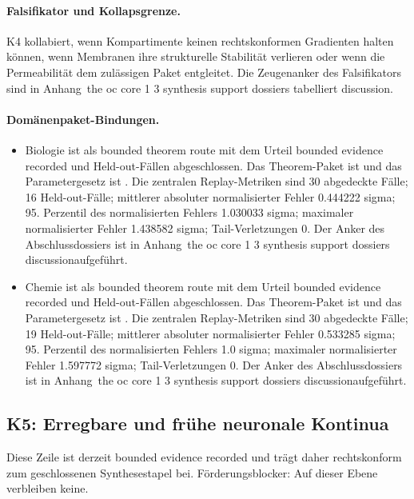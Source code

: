 \paragraph{Falsifikator und Kollapsgrenze.}
K4 kollabiert, wenn Kompartimente keinen rechtskonformen Gradienten halten können, wenn Membranen ihre strukturelle Stabilität verlieren oder wenn die Permeabilität dem zulässigen Paket entgleitet.
Die Zeugenanker des Falsifikators sind in Anhang~the oc core 1 3 synthesis support dossiers tabelliert discussion.

\paragraph{Domänenpaket-Bindungen.}
\begin{itemize}[leftmargin=1.6em,nosep]
\item Biologie ist als bounded theorem route mit dem Urteil bounded evidence recorded und  Held-out-Fällen abgeschlossen. Das Theorem-Paket ist  und das Parametergesetz ist . Die zentralen Replay-Metriken sind 30 abgedeckte Fälle; 16 Held-out-Fälle; mittlerer absoluter normalisierter Fehler 0.444222 sigma; 95. Perzentil des normalisierten Fehlers 1.030033 sigma; maximaler normalisierter Fehler 1.438582 sigma; Tail-Verletzungen 0. Der Anker des Abschlussdossiers ist in Anhang~the oc core 1 3 synthesis support dossiers discussionaufgeführt.
\item Chemie ist als bounded theorem route mit dem Urteil bounded evidence recorded und  Held-out-Fällen abgeschlossen. Das Theorem-Paket ist  und das Parametergesetz ist . Die zentralen Replay-Metriken sind 30 abgedeckte Fälle; 19 Held-out-Fälle; mittlerer absoluter normalisierter Fehler 0.533285 sigma; 95. Perzentil des normalisierten Fehlers 1.0 sigma; maximaler normalisierter Fehler 1.597772 sigma; Tail-Verletzungen 0. Der Anker des Abschlussdossiers ist in Anhang~the oc core 1 3 synthesis support dossiers discussionaufgeführt.
\end{itemize}

\subsection{K5: Erregbare und frühe neuronale Kontinua}
\label{sec:oc-core-1-3-synthesis-k5}
Diese Zeile ist derzeit bounded evidence recorded und trägt daher rechtskonform zum geschlossenen Synthesestapel bei.
Förderungsblocker: Auf dieser Ebene verbleiben keine.

